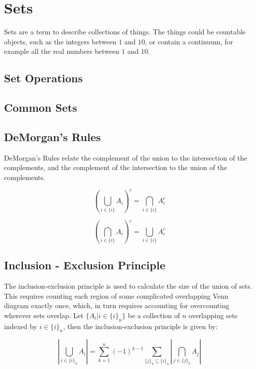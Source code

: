 \section{Sets}

Sets are a term to describe collections of things. The things could be countable objects, such as the integers between $1$ and $10$, or contain a continuum, for example all the real numbers between $1$ and $10$.

\subsection{Set Operations}

\subsection{Common Sets}

\subsection{DeMorgan's Rules}
\label{sec:demorgan}
DeMorgan's Rules relate the complement of the union to the intersection of the complements, and the complement of the intersection to the union of the complements.

\label{sec:demorgan}

\begin{equation}
\left(\bigcup_{i\in\{i\}}A_i\right)^c = \bigcap_{i\in\{i\}}A^c_i
\end{equation}

\begin{equation}
\left(\bigcap_{i\in\{i\}}A_i\right)^c = \bigcup_{i\in\{i\}}A^c_i
\end{equation}

\subsection{Inclusion - Exclusion Principle}
\label{inclusionexclusion}

The inclusion-exclusion principle is used to calculate the size of the union of sets. This requires counting each region of some complicated overlapping Venn diagram exactly once, which, in turn requires accounting for overcounting wherever sets overlap. Let $\{A_i | i\in \{i\}_n \}$ be a collection of $n$ overlapping sets indexed by $i\in \{i\}_n$, then the inclusion-exclusion principle is given by:

\begin{equation}
\left|\bigcup_{i\in\{i\}_n} A_i\right| = \sum^n_{k=1} (-1)^{k-1} \sum_{\{j\}_k \subseteq \{i\}_n} \left|\bigcap_{j\in\{j\}_k} A_j\right|
\end{equation}


